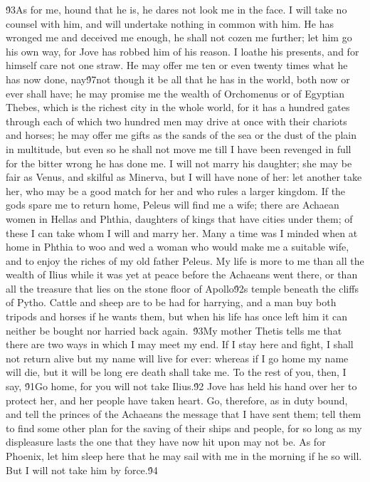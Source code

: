{\'93As for me, hound that he is, he dares not look me in the face. I will take no counsel with him, and will undertake nothing in common with him. He has wronged me and deceived me enough, he shall not cozen me further; let him go his own way, for Jove has robbed him of his reason. I loathe his presents, and for himself care not one straw. He may offer me ten or even twenty times what he has now done, nay\'97not though it be all that he has in the world, both now or ever shall have; he may promise me the wealth of Orchomenus or of Egyptian Thebes, which is the richest city in the whole world, for it has a hundred gates through each of which two hundred men may drive at once with their chariots and horses; he may offer me gifts as the sands of the sea or the dust of the plain in multitude, but even so he shall not move me till I have been revenged in full for the bitter wrong he has done me. I will not marry his daughter; she may be fair as Venus, and skilful as Minerva, but I will have none of her: let another take her, who may be a good match for her and who rules a larger kingdom. If the gods spare me to return home, Peleus will find me a wife; there are Achaean women in Hellas and Phthia, daughters of kings that have cities under them; of these I can take whom I will and marry her. Many a time was I minded when at home in Phthia to woo and wed a woman who would make me a suitable wife, and to enjoy the riches of my old father Peleus. My life is more to me than all the wealth of Ilius while it was yet at peace before the Achaeans went there, or than all the treasure that lies on the stone floor of Apollo\'92s temple beneath the cliffs of Pytho. Cattle and sheep are to be had for harrying, and a man buy both tripods and horses if he wants them, but when his life has once left him it can neither be bought nor harried back again.\
\'93My mother Thetis tells me that there are two ways in which I may meet my end. If I stay here and fight, I shall not return alive but my name will live for ever: whereas if I go home my name will die, but it will be long ere death shall take me. To the rest of you, then, I say, \'91Go home, for you will not take Ilius.\'92 Jove has held his hand over her to protect her, and her people have taken heart. Go, therefore, as in duty bound, and tell the princes of the Achaeans the message that I have sent them; tell them to find some other plan for the saving of their ships and people, for so long as my displeasure lasts the one that they have now hit upon may not be. As for Phoenix, let him sleep here that he may sail with me in the morning if he so will. But I will not take him by force.\'94\
}
